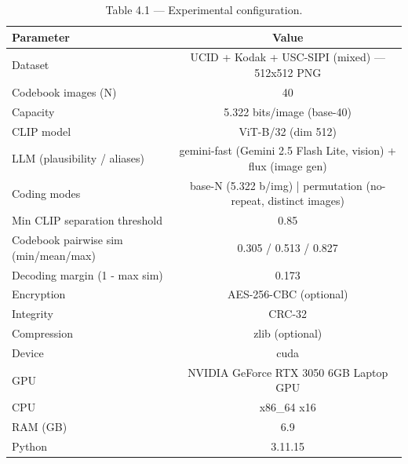 \begin{table}[htbp]
\centering
\caption{Table 4.1 — Experimental configuration.}
\label{tab:table_4_1_setup}
\begin{tabular}{lc}
\hline
Parameter & Value \\
\hline
Dataset & UCID + Kodak + USC-SIPI (mixed) — 512x512 PNG \\
Codebook images (N) & 40 \\
Capacity & 5.322 bits/image (base-40) \\
CLIP model & ViT-B/32 (dim 512) \\
LLM (plausibility / aliases) & gemini-fast (Gemini 2.5 Flash Lite, vision) + flux (image gen) \\
Coding modes & base-N (5.322 b/img) | permutation (no-repeat, distinct images) \\
Min CLIP separation threshold & 0.85 \\
Codebook pairwise sim (min/mean/max) & 0.305 / 0.513 / 0.827 \\
Decoding margin (1 - max sim) & 0.173 \\
Encryption & AES-256-CBC (optional) \\
Integrity & CRC-32 \\
Compression & zlib (optional) \\
Device & cuda \\
GPU & NVIDIA GeForce RTX 3050 6GB Laptop GPU \\
CPU & x86_64 x16 \\
RAM (GB) & 6.9 \\
Python & 3.11.15 \\
\hline
\end{tabular}
\end{table}
